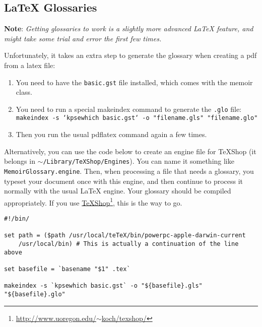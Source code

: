 \subsection{LaTeX Glossaries }
\label{latexglossaries}

\textbf{Note}: \emph{Getting glossaries to work is a slightly more advanced LaTeX
feature, and might take some trial and error the first few times.}

Unfortunately, it takes an extra step to generate the glossary when creating a
pdf from a latex file:

\begin{enumerate}
\item You need to have the \texttt{basic.gst} file installed, which comes with the
memoir class.

\item You need to run a special makeindex command to generate the \texttt{.glo} file:
\texttt{makeindex -s `kpsewhich basic.gst` -o "filename.gls" "filename.glo"}

\item Then you run the usual pdflatex command again a few times.

\end{enumerate}

Alternatively, you can use the code below to create an engine file for TeXShop (it belongs in \texttt{\ensuremath{\sim}\slash Library\slash TeXShop\slash Engines}). You can name it something like \texttt{MemoirGlossary.engine}. Then, when processing a file that needs a glossary, you typeset your document once with this engine, and then continue to process it normally with the usual LaTeX engine. Your glossary should be compiled appropriately. If you use \href{http://www.uoregon.edu/~koch/texshop/}{TeXShop}\footnote{\href{http://www.uoregon.edu/~koch/texshop/}{http:\slash \slash www.uoregon.edu\slash \ensuremath{\sim}koch\slash texshop\slash }}, this is the way to go.

\begin{verbatim}
#!/bin/	

set path = ($path /usr/local/teTeX/bin/powerpc-apple-darwin-current 
	/usr/local/bin) # This is actually a continuation of the line above

set basefile = `basename "$1" .tex`

makeindex -s `kpsewhich basic.gst` -o "${basefile}.gls" "${basefile}.glo"
\end{verbatim}



